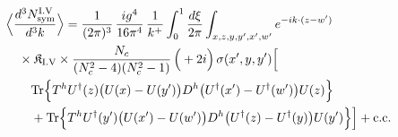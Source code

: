 \begingroup\small
\begin{align}\label{eq:S-I.V-3}
&\Big\langle\frac{d^{3}N^{\rm I.V}_{{\rm sym}}}{d^{3}k}\Big\rangle=\frac{1}{(2\pi)^{3}}\, \frac{ig^{4}}{16\pi^{4}}\, \frac{1}{k^{+}} \int_{0}^{1}\frac{d\xi}{2\pi} \int_{x,z,y,y',x',w'}e^{-ik\cdot(z-w')}\notag\\
&\quad \times \mathfrak{K}_{\rm I.V} \times \frac{N_{c}}{(N_{c}^{2}-4)(N_{c}^{2}-1)}\, \Big(+2i\Big)\, \sigma(x',y,y')\Big[\notag\\
&\quad\quad {\rm Tr}\Big\{T^{h}U^{\dagger}(z)\big(U(x)-U(y')\big)D^{h}\big(U^{\dagger}(x')-U^{\dagger}(w')\big)U(z)\Big\}\notag\\
&\quad\quad +{\rm Tr}\Big\{T^{h}U^{\dagger}(y')\big(U(x')-U(w')\big)D^{h}\big(U^{\dagger}(z)-U^{\dagger}(y)\big)U(y')\Big\}\Big] +{\rm c.c.}
\end{align}
\endgroup
